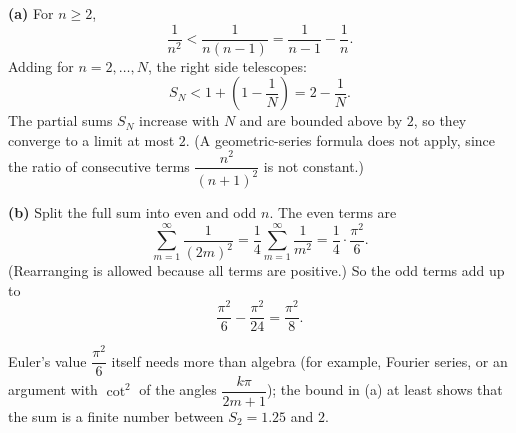 \textbf{(a)} For $n\ge2$,
\[
\dfrac{1}{n^2}<\dfrac{1}{n(n-1)}=\dfrac{1}{n-1}-\dfrac{1}{n} .
\]
Adding for $n=2,\dots,N$, the right side telescopes:
\[
S_N<1+\left(1-\dfrac{1}{N}\right)=2-\dfrac{1}{N} .
\]
The partial sums $S_N$ increase with $N$ and are bounded above by $2$, so they converge to a limit at most $2$. (A geometric-series formula does not apply, since the ratio of consecutive terms $\dfrac{n^2}{(n+1)^2}$ is not constant.)

\textbf{(b)} Split the full sum into even and odd $n$. The even terms are
\[
\sum_{m=1}^{\infty}\dfrac{1}{(2m)^2}=\dfrac{1}{4}\sum_{m=1}^{\infty}\dfrac{1}{m^2}=\dfrac{1}{4}\cdot\dfrac{\pi^2}{6}.
\]
(Rearranging is allowed because all terms are positive.) So the odd terms add up to
\[
\dfrac{\pi^2}{6}-\dfrac{\pi^2}{24}=\boxed{\dfrac{\pi^2}{8}}.
\]

Euler's value $\dfrac{\pi^2}{6}$ itself needs more than algebra (for example, Fourier series, or an argument with $\cot^2$ of the angles $\dfrac{k\pi}{2m+1}$); the bound in (a) at least shows that the sum is a finite number between $S_2=1.25$ and $2$.
